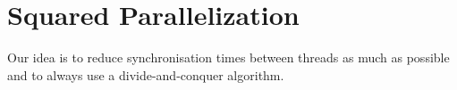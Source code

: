 \section{Squared Parallelization}\label{squared-parallelization}

Our idea is to reduce synchronisation times between threads as much as possible and to always use a divide-and-conquer algorithm.


\FloatBarrier
